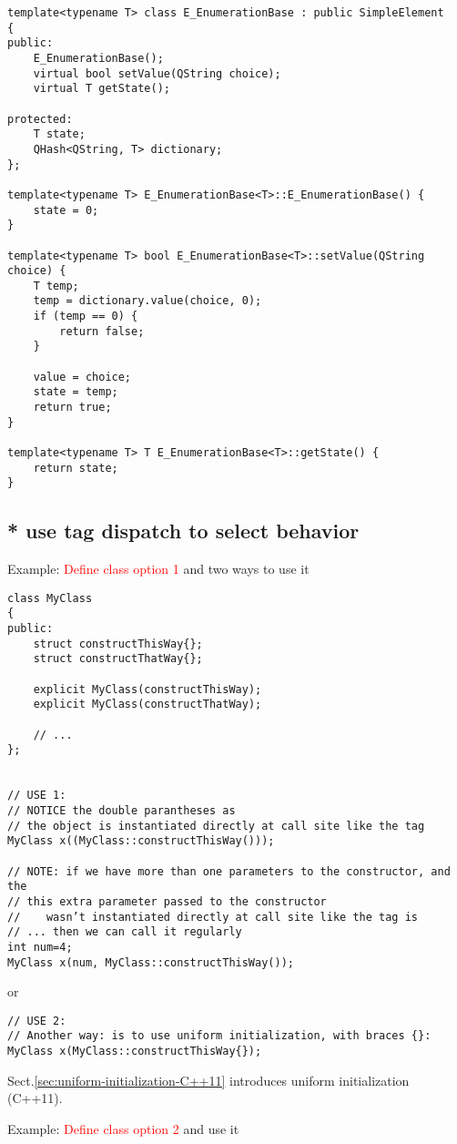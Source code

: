 \begin{lstlisting}
template<typename T> class E_EnumerationBase : public SimpleElement
{
public:
    E_EnumerationBase();
    virtual bool setValue(QString choice);
    virtual T getState();

protected:
    T state;
    QHash<QString, T> dictionary;
};

template<typename T> E_EnumerationBase<T>::E_EnumerationBase() {
    state = 0;
}

template<typename T> bool E_EnumerationBase<T>::setValue(QString choice) {
    T temp;
    temp = dictionary.value(choice, 0);
    if (temp == 0) {
        return false;
    }

    value = choice;
    state = temp;
    return true;
}

template<typename T> T E_EnumerationBase<T>::getState() {
    return state;
}
\end{lstlisting}

\subsection{* use tag dispatch to select behavior}

Example: \textcolor{red}{Define class option 1} and two ways to use it
\begin{verbatim}
class MyClass
{
public:
    struct constructThisWay{};
    struct constructThatWay{};
 
    explicit MyClass(constructThisWay);
    explicit MyClass(constructThatWay);
 
    // ...
};


// USE 1:
// NOTICE the double parantheses as
// the object is instantiated directly at call site like the tag
MyClass x((MyClass::constructThisWay()));

// NOTE: if we have more than one parameters to the constructor, and the
// this extra parameter passed to the constructor 
//    wasn’t instantiated directly at call site like the tag is
// ... then we can call it regularly
int num=4;
MyClass x(num, MyClass::constructThisWay());
\end{verbatim}
or
\begin{lstlisting}
// USE 2:
// Another way: is to use uniform initialization, with braces {}:
MyClass x(MyClass::constructThisWay{});
\end{lstlisting}
Sect.\ref{sec:uniform-initialization-C++11} introduces uniform initialization (C++11).

Example: \textcolor{red}{Define class option 2} and use it

